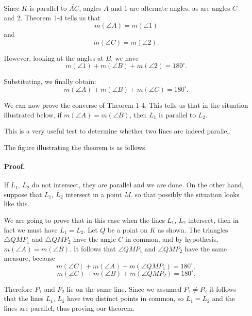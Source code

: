 \documentclass[12pt]{book} %
\begin{document}
Since $K$ is parallel to $\overleftrightarrow{AC}$, angles $A$ and 1 are alternate angles, as are angles $C$ and 2. Theorem 1-4 tells us that
\[
m(\angle A)=m(\angle 1)
\]
and
\[
m(\angle C)=m(\angle 2).
\]

However, looking at the angles at $B$, we have
\[
m(\angle 1)+m(\angle B)+m(\angle 2)=180^\circ.
\]

Substituting, we finally obtain:
\[
m(\angle A)+m(\angle B)+m(\angle C)=180^\circ.
\]

We can now prove the converse of Theorem 1-4. This tells us that in the situation illustrated below, if $m(\angle A)=m(\angle B)$, then $L_1$ is parallel to $L_2$.


This is a very useful test to determine whether two lines are indeed parallel.


The figure illustrating the theorem is as follows.


\paragraph{Proof.}
If $L_1$, $L_2$ do not intersect, they are parallel and we are done. On the other hand, suppose that $L_1$, $L_2$ intersect in a point $M$, so that possibly the situation looks like this.


We are going to prove that in this case when the lines $L_1$, $L_2$ intersect, then in fact we must have $L_1=L_2$. Let $Q$ be a point on $K$ as shown. The triangles $\triangle QMP_1$ and $\triangle QMP_2$ have the angle $C$ in common, and by hypothesis, $m(\angle A)=m(\angle B)$. It follows that $\angle QMP_1$ and $\angle QMP_2$ have the same measure, because
\[
m(\angle C)+m(\angle A)+m(\angle QMP_1)=180^\circ,
\]
\[
m(\angle C)+m(\angle B)+m(\angle QMP_2)=180^\circ.
\]

Therefore $P_1$ and $P_2$ lie on the same line. Since we assumed $P_1\ne P_2$ it follows that the lines $L_1$, $L_2$ have two distinct points in common, so $L_1=L_2$ and the lines are parallel, thus proving our theorem.
\end{document}
